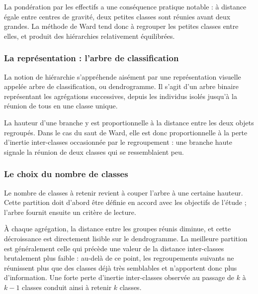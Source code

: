 La pondération par les effectifs a une conséquence pratique notable : à distance égale entre centres de gravité, deux petites classes sont réunies avant deux grandes. La méthode de Ward tend donc à regrouper les petites classes entre elles, et produit des hiérarchies relativement équilibrées.

\medskip
\noindent{}
\medskip

\subsubsection*{La représentation : l'arbre de classification}

La notion de hiérarchie s'appréhende aisément par une représentation visuelle appelée arbre de classification, ou dendrogramme. Il s'agit d'un arbre binaire représentant les agrégations successives, depuis les individus isolés jusqu'à la réunion de tous en une classe unique.

La hauteur d'une branche y est proportionnelle à la distance entre les deux objets regroupés. Dans le cas du saut de Ward, elle est donc proportionnelle à la perte d'inertie inter-classes occasionnée par le regroupement : une branche haute signale la réunion de deux classes qui se ressemblaient peu.

\subsubsection*{Le choix du nombre de classes}

Le nombre de classes à retenir revient à couper l'arbre à une certaine hauteur. Cette partition doit d'abord être définie en accord avec les objectifs de l'étude ; l'arbre fournit ensuite un critère de lecture.

À chaque agrégation, la distance entre les groupes réunis diminue, et cette décroissance est directement lisible sur le dendrogramme. La meilleure partition est généralement celle qui précède une valeur de la distance inter-classes brutalement plus faible : au-delà de ce point, les regroupements suivants ne réunissent plus que des classes déjà très semblables et n'apportent donc plus d'information. Une forte perte d'inertie inter-classes observée au passage de $k$ à $k-1$ classes conduit ainsi à retenir $k$ classes.

